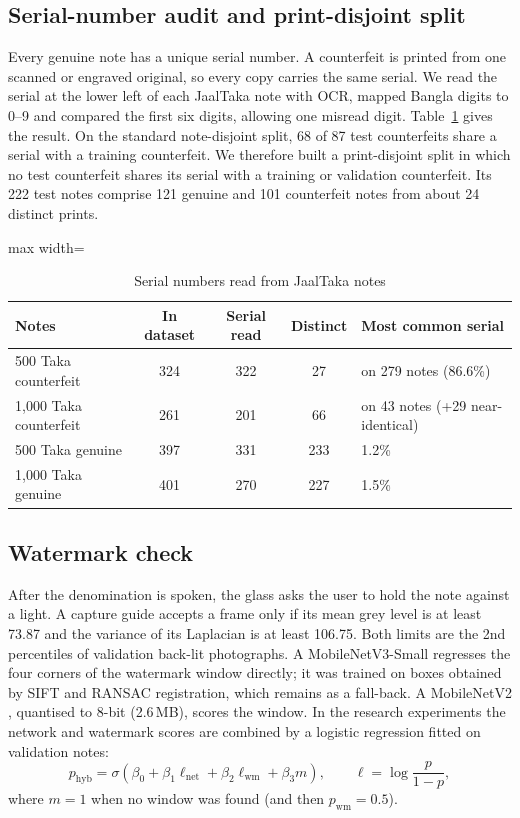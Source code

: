 \documentclass[preprint,12pt]{elsarticle}
\begin{document}
\subsection{Serial-number audit and print-disjoint split}
\label{sec:m_serial}
Every genuine note has a unique serial number. A counterfeit is printed from one scanned or engraved original, so every copy carries the same serial. We read the serial at the lower left of each JaalTaka note with OCR, mapped Bangla digits to 0--9 and compared the first six digits, allowing one misread digit. Table~\ref{tab:serial} gives the result. On the standard note-disjoint split, 68 of 87 test counterfeits share a serial with a training counterfeit. We therefore built a print-disjoint split in which no test counterfeit shares its serial with a training or validation counterfeit. Its 222 test notes comprise 121 genuine and 101 counterfeit notes from about 24 distinct prints.

\begin{table}[!htbp]
\caption{Serial numbers read from JaalTaka notes}
\label{tab:serial}
\centering\small
\begin{adjustbox}{max width=\textwidth}\begin{tabular}{@{}lcccl@{}}
\toprule
Notes & In dataset & Serial read & Distinct & Most common serial \\ \midrule
500 Taka counterfeit & 324 & 322 & 27 & on 279 notes (86.6\%) \\
1,000 Taka counterfeit & 261 & 201 & 66 & on 43 notes (+29 near-identical) \\
500 Taka genuine & 397 & 331 & 233 & 1.2\% \\
1,000 Taka genuine & 401 & 270 & 227 & 1.5\% \\ \bottomrule
\end{tabular}\end{adjustbox}
\end{table}

\subsection{Watermark check}
\label{sec:m_wm}
After the denomination is spoken, the glass asks the user to hold the note against a light. A capture guide accepts a frame only if its mean grey level is at least 73.87 and the variance of its Laplacian \cite{pechpacheco2000} is at least 106.75. Both limits are the 2nd percentiles of validation back-lit photographs. A MobileNetV3-Small \cite{mobilenetv3} regresses the four corners of the watermark window directly; it was trained on boxes obtained by SIFT \cite{sift} and RANSAC \cite{ransac} registration, which remains as a fall-back. A MobileNetV2 \cite{mobilenetv2}, quantised to 8-bit (2.6\,MB), scores the window. In the research experiments the network and watermark scores are combined by a logistic regression fitted on validation notes:
\begin{equation}
p_{\mathrm{hyb}}=\sigma\!\left(\beta_0+\beta_1\ell_{\mathrm{net}}+\beta_2\ell_{\mathrm{wm}}+\beta_3 m\right),\qquad \ell=\log\frac{p}{1-p},
\end{equation}
where $m=1$ when no window was found (and then $p_{\mathrm{wm}}=0.5$).
\end{document}
